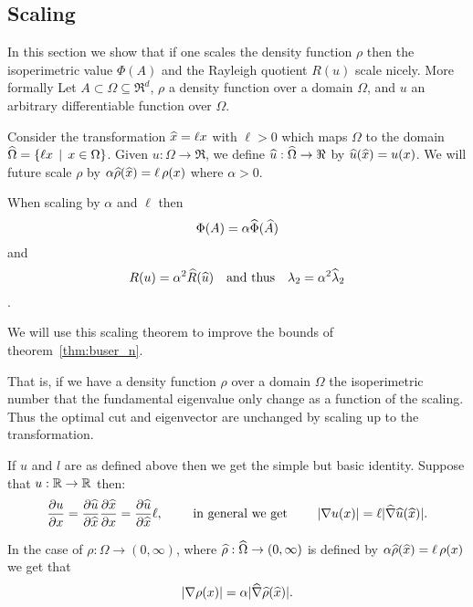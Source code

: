 
\subsection{Scaling}\label{sec:scaling}

In this section we show that if one scales the density function $\rho$ then
the isoperimetric value $\Phi(A)$ and the Rayleigh quotient $R(u)$
scale nicely. More formally Let $A \subset \Omega \subseteq
\Re^d$, $\rho$ a density function over a domain $\Omega$, and
$u$ an arbitrary differentiable  function over $\Omega$.

Consider the transformation
$\widehat{x} = \ell x$ with $\ell > 0$ which maps $\Omega$ to the domain
$\widehat{\Omega} = \{\ell x \,\mid\, x \in \Omega\}$. Given $u:\Omega \rightarrow
\Re$, we define $\widehat{u}: \widehat{\Omega} \rightarrow \Re$ by $\widehat{u}(\widehat{x}) =
u(x)$. We will future scale $\rho$ by $\alpha \widehat{\rho}(\widehat{x}) = \ell \, \rho(x)$ where
$\alpha > 0$.

\begin{theorem}\label{thm:scaling}
  When scaling by $\alpha$ and $\ell$ then
  \[   \Phi(A) = \alpha \widehat{\Phi}(\widehat{A}) \] and
  \[  R(u)  = \alpha^2 \widehat{R}(\widehat{u}) \quad \text{and thus} \quad\lambda_2 = \alpha^2 \widehat{\lambda}_2\].
\end{theorem}

We will use this scaling theorem to improve the bounds
of theorem~\ref{thm:buser_n}. 

That is, if we have a density function $\rho$ over
a domain $\Omega$ the isoperimetric number that the fundamental eigenvalue only
change as a function  of the scaling.  Thus the optimal cut and eigenvector are
unchanged by scaling up to the transformation.


If $u$ and $l$ are as defined above then we get the simple but basic identity. 
Suppose that $u: {\mathbb R} \rightarrow {\mathbb R}$ then: \[
\frac{\partial u}{\partial x} 
= \frac{\partial \widehat{u}}{\partial \widehat{x}} \frac{\partial \widehat{x}}{\partial x}
= \frac{\partial \widehat{u}}{\partial \widehat{x}} \ell,
\qquad \text{ in general we get } \qquad
|\nabla u(x)| = \ell |\widehat{\nabla} \widehat{u}(\widehat{x})|.
\]

In the case of $\rho:\Omega \rightarrow (0,\infty)$, where
$\widehat{\rho}: \widehat{\Omega} \rightarrow (0,\infty)$ is defined by
$ \alpha \widehat{\rho}(\widehat{x}) = \ell \, \rho(x)$ we get that
\[
|\nabla \rho(x)| = \alpha |\widehat{\nabla} \widehat{\rho}(\widehat{x})|.
\]

